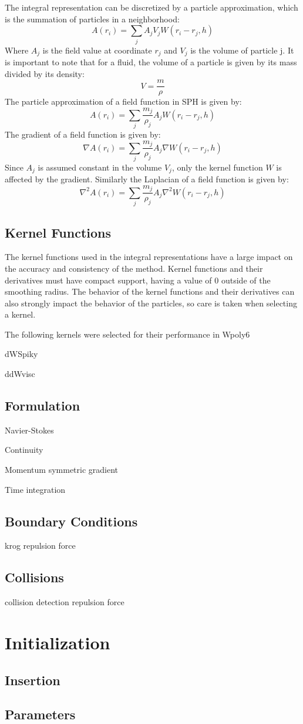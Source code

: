 The integral representation can be discretized by a particle approximation, which is the summation of particles in a neighborhood:
$$
A(r_i) = \sum_j A_j V_j W(r_i-r_j, h)
$$
Where $A_j$ is the field value at coordinate $r_j$ and $V_j$ is the volume of
particle j. It is important to note that for a fluid, the volume of a particle is given by
its mass divided by its density:
$$
V = \frac{m}{\rho}
$$
The particle approximation of a field function in SPH is given by:
$$
A(r_i) = \sum_j \frac{m_j}{\rho_j} A_j W(r_i - r_j, h)
$$ 
The gradient of a field function is given by:
$$
\nabla A(r_i) = \sum_j \frac{m_j}{\rho_j} A_j \nabla W(r_i - r_j, h)
$$
Since $A_j$ is assumed constant in the volume $V_j$, only the kernel function
$W$ is affected by the gradient. Similarly the Laplacian of a field function is
given by:
$$
\nabla^2 A(r_i) = \sum_j \frac{m_j}{\rho_j} A_j \nabla^2 W(r_i - r_j, h)
$$



\subsection{Kernel Functions}

The kernel functions used in the integral representations have a large impact
on the accuracy and consistency of the method. Kernel functions and their
derivatives must have compact support, having a value of 0 outside of the
smoothing radius. The behavior of the kernel functions and their derivatives
can also strongly impact the behavior of the particles, so care is taken when
selecting a kernel.

The following kernels were selected for their performance in \cite{Krog}
Wpoly6

dWSpiky  %

ddWvisc   



\subsection{Formulation}

Navier-Stokes

Continuity

Momentum
symmetric gradient

Time integration

\subsection{Boundary Conditions}
krog repulsion force
\subsection{Collisions}
collision detection
repulsion force


\section{Initialization}
\subsection{Insertion}
\subsection{Parameters}



